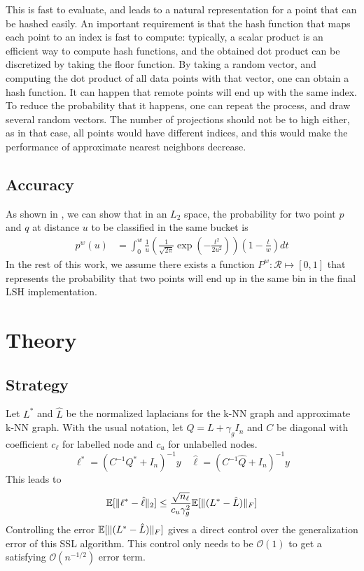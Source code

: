 \documentclass{article} %
\begin{document}
This is fast to evaluate, and leads to a natural representation for a point that can be hashed easily.  An important requirement is that the hash function that maps each point to an index is fast to compute: typically, a scalar product is an efficient way to compute hash functions, and the obtained dot product can be discretized by taking the floor function. By taking a random vector, and computing the dot product of all data points with that vector, one can obtain a hash function. It can happen that remote points will end up with the same index. To reduce the probability that it happens, one can repeat the process, and draw several random vectors. The number of projections should not be to high either, as in that case, all points would have different indices, and this would make the performance of approximate nearest neighbors decrease.

\subsection{Accuracy}
As shown in \cite{slaney2008locality}, we can show that in an $L_2$ space, the probability for two point $p$ and $q$ at distance $u$ to be classified in the same bucket is 
\begin{align*}
  p^w(u) &= \int_0^w \frac{1}{u}\left( \frac{1}{\sqrt{2\pi}}\exp(-\frac{t^2}{2u^2})\right)\left(1-\frac{t}{w}\right)dt
\end{align*}
In the rest of this work, we assume there exists a function $P^w:\mathcal{R}\mapsto [0,1]$ that represents the probability that two points will end up in the same bin in the final LSH implementation.

\section{Theory}
\subsection{Strategy}
Let $L^*$ and $\hat{L}$ be the normalized laplacians for the k-NN graph and approximate k-NN graph. With the usual notation, let $Q = L+\gamma_gI_n$ and $C$ be diagonal with coefficient $c_\ell$ for labelled node and $c_u$ for unlabelled nodes.
$$\ell^* = (C^{-1}Q^* + I_n)^{-1}y \quad \hat{\ell} = (C^{-1}\hat{Q} + I_n)^{-1}y$$
This leads to 
$$ \mathbb{E}[\Arrowvert\ell^*-\hat{\ell}\Arrowvert_2] \leq \frac{\sqrt{n_\ell}}{c_u\gamma_g^2}\mathbb{E}[\Arrowvert(L^*-\hat{L})\Arrowvert_F]$$
Controlling the error $\mathbb{E}[\Arrowvert(L^*-\hat{L})\Arrowvert_F]$ gives a direct control over the generalization error of this SSL algorithm. This control only needs to be $\mathcal{O}(1)$ to get a satisfying $\mathcal{O}(n^{-1/2})$ error term.
\end{document}
